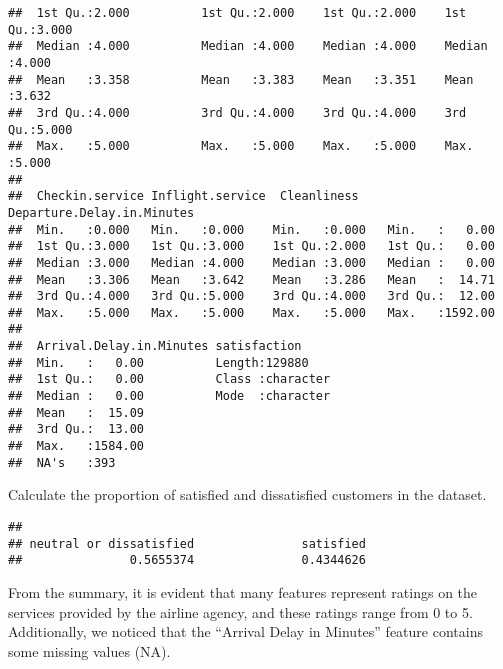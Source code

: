 \documentclass[
]{article}
\newenvironment{Shaded}{\begin{snugshade}}{\end{snugshade}}
\newcommand{\FunctionTok}[1]{\textcolor[rgb]{0.13,0.29,0.53}{\textbf{#1}}}
\newcommand{\NormalTok}[1]{#1}
\newcommand{\SpecialCharTok}[1]{\textcolor[rgb]{0.81,0.36,0.00}{\textbf{#1}}}
\begin{document}
\begin{verbatim}
##  1st Qu.:2.000          1st Qu.:2.000    1st Qu.:2.000    1st Qu.:3.000   
##  Median :4.000          Median :4.000    Median :4.000    Median :4.000   
##  Mean   :3.358          Mean   :3.383    Mean   :3.351    Mean   :3.632   
##  3rd Qu.:4.000          3rd Qu.:4.000    3rd Qu.:4.000    3rd Qu.:5.000   
##  Max.   :5.000          Max.   :5.000    Max.   :5.000    Max.   :5.000   
##                                                                           
##  Checkin.service Inflight.service  Cleanliness    Departure.Delay.in.Minutes
##  Min.   :0.000   Min.   :0.000    Min.   :0.000   Min.   :   0.00           
##  1st Qu.:3.000   1st Qu.:3.000    1st Qu.:2.000   1st Qu.:   0.00           
##  Median :3.000   Median :4.000    Median :3.000   Median :   0.00           
##  Mean   :3.306   Mean   :3.642    Mean   :3.286   Mean   :  14.71           
##  3rd Qu.:4.000   3rd Qu.:5.000    3rd Qu.:4.000   3rd Qu.:  12.00           
##  Max.   :5.000   Max.   :5.000    Max.   :5.000   Max.   :1592.00           
##                                                                             
##  Arrival.Delay.in.Minutes satisfaction      
##  Min.   :   0.00          Length:129880     
##  1st Qu.:   0.00          Class :character  
##  Median :   0.00          Mode  :character  
##  Mean   :  15.09                            
##  3rd Qu.:  13.00                            
##  Max.   :1584.00                            
##  NA's   :393
\end{verbatim}

Calculate the proportion of satisfied and dissatisfied customers in the
dataset.

\begin{Shaded}
\end{Shaded}

\begin{verbatim}
## 
## neutral or dissatisfied               satisfied 
##               0.5655374               0.4344626
\end{verbatim}

From the summary, it is evident that many features represent ratings on
the services provided by the airline agency, and these ratings range
from 0 to 5. Additionally, we noticed that the ``Arrival Delay in
Minutes'' feature contains some missing values (NA).
\end{document}
